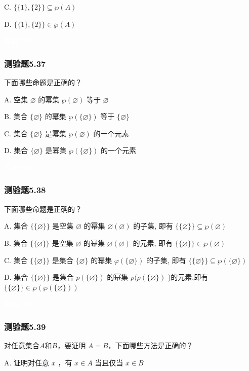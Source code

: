 \documentclass[UTF8, heading=true]{ctexart}
\begin{document}
C. $\{\{1\},\{2\}\} \subseteq \wp(A) $

D. $\{\{1\},\{2\}\} \in \wp(A)$

\textcolor{white}{答案：BC}



\subsubsection{测验题5.37}

下面哪些命题是正确的？

A. 
空集 $\varnothing$ 的幂集 $\wp(\varnothing)$ 等于 $\varnothing$

B. 
集合 $\{\varnothing\}$ 的幂集 $\wp(\{\varnothing\})$ 等于 $\{\varnothing\}$

C. 
集合 $\{\varnothing\}$ 是幂集 $\wp(\varnothing)$ 的一个元素

D. 
集合 $\{\varnothing\}$ 是幂集 $\wp(\{\varnothing\})$ 的一个元素

\textcolor{white}{答案：D}

\subsubsection{测验题5.38}

下面哪些命题是正确的？

A. 
集合 $\{\{\varnothing\}\}$ 是空集 $\varnothing$ 的幂集 $\varnothing(\varnothing)$ 的子集, 即有 $\{\{\varnothing\}\} \subseteq \wp(\varnothing)$

B. 
集合 $\{\{\varnothing\}\}$ 是空集 $\varnothing$ 的幂集 $\varnothing(\varnothing)$ 的元素, 即有 $\{\{\varnothing\}\} \in \wp(\varnothing)$

C. 
集合 $\{\{\varnothing\}\}$ 是集合 $\{\varnothing\}$ 的幂集 $\varphi(\{\varnothing\})$ 的子集, 即有 $\{\{\varnothing\}\} \subseteq \wp(\{\varnothing\})$

D. 
集合 $\{\{\varnothing\}\}$ 是集合 $p(\{\varnothing\})$ 的幂集 $\rho(\rho(\{\varnothing\})$ )的元素,即有 $\{\{\varnothing\}\} \in \wp(\wp(\{\varnothing\}))$

\textcolor{white}{答案：CD}

\subsubsection{测验题5.39}

对任意集合$A$和$B$，要证明
$A=B$，下面哪些方法是正确的？

A. 证明对任意 $x$ ，有 $x \in A$ 当且仅当 $x \in B$
\end{document}
